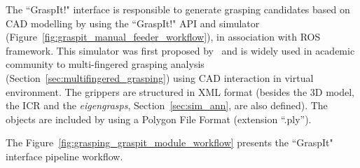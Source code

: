 The ``GraspIt!" interface is responsible to generate grasping candidates based on CAD modelling by using the ``GraspIt!" API and simulator (Figure~\ref{fig:graspit_manual_feeder_workflow}), in association with \ac{ROS} framework. This simulator was first proposed by~\cite{miller2004graspit} and is widely used in academic community to multi-fingered grasping analysis (Section~\ref{sec:multifingered_grasping}) using CAD interaction in virtual environment. The grippers are structured in XML format (besides the 3D model, the \ac{ICR} and the \textit{eigengrasps}, Section~\ref{sec:sim_ann}, are also defined). The objects are included by using a Polygon File Format (extension ``.ply'').

\begin{figure}[h!]
\end{figure}

The Figure~\ref{fig:grasping_graspit_module_workflow} presents the ``GraspIt" interface pipeline workflow.

